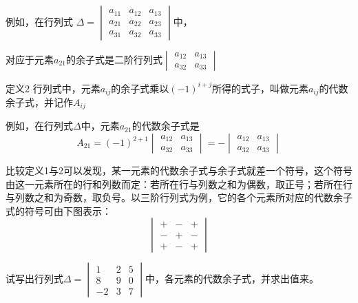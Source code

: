 例如，在行列式
$\Delta =\begin{vmatrix}
    a_{11}&a_{12}&a_{13}\\
    a_{21}&a_{22}&a_{23}\\
    a_{31}&a_{32}&a_{33}
\end{vmatrix}$中，

对应于元素$a_{21}$的余子式是二阶行列式$\begin{vmatrix}
    a_{12}&a_{13}\\a_{32}&a_{33}
\end{vmatrix}$


\begin{blk}{定义2}
    行列式中，元素$a_{ij}$的余子式乘以$(-1)^{i+j}$所得的式子，叫做元素$a_{ij}$的代数余子式，并记作$A_{ij}$
\end{blk}

例如，在行列式$\Delta$中，元素$a_{21}$的代数余子式是
\[A_{21}=(-1)^{2+1}\begin{vmatrix}
    a_{12}&a_{13}\\a_{32}&a_{33}
\end{vmatrix}=-\begin{vmatrix}
    a_{12}&a_{13}\\a_{32}&a_{33}
\end{vmatrix}\]


比较定义1与2可以发现，某一元素的代数余子式与余子式就差一个符号，这个符号由这一元素所在的行和列数而定：若所在行与列数之和为偶数，取正号；若所在行与列数之和为奇数，取负号。以三阶行列式为例，它的各个元素所对应的代数余子式的符号可由下图表示：
\[\begin{vmatrix}
    +&-&+\\-&+&-\\ +&-&+
\end{vmatrix}\]


\begin{example}
    试写出行列式$\Delta=\begin{vmatrix}
        1&2&5\\8&9&0\\-2&3&7
    \end{vmatrix}$中，各元素的代数余子式，并求出值来。
\end{example}


